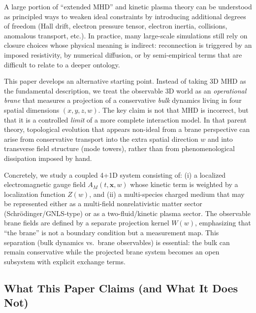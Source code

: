 \documentclass[11pt]{article}
\newcommand{\x}{\mathbf{x}}     %
\begin{document}
A large portion of ``extended MHD'' and kinetic plasma theory can be understood as principled ways to weaken ideal constraints by introducing additional degrees of freedom (Hall drift, electron pressure tensor, electron inertia, collisions, anomalous transport, etc.). In practice, many large-scale simulations still rely on closure choices whose physical meaning is indirect: reconnection is triggered by an imposed resistivity, by numerical diffusion, or by semi-empirical terms that are difficult to relate to a deeper ontology.

This paper develops an alternative starting point. Instead of taking 3D MHD as the fundamental description, we treat the observable 3D world as an \emph{operational brane} that measures a projection of a conservative \emph{bulk} dynamics living in four spatial dimensions \((x,y,z,w)\). The key claim is not that MHD is incorrect, but that it is a controlled \emph{limit} of a more complete interaction model. In that parent theory, topological evolution that appears non-ideal from a brane perspective can arise from conservative transport into the extra spatial direction \(w\) and into transverse field structure (mode towers), rather than from phenomenological dissipation imposed by hand.

Concretely, we study a coupled 4+1D system consisting of:
(i) a localized electromagnetic gauge field \(A_M(t,\x,w)\) whose kinetic term is weighted by a localization function \(Z(w)\), and
(ii) a multi-species charged medium that may be represented either as a multi-field nonrelativistic matter sector (Schr\"odinger/GNLS-type) or as a two-fluid/kinetic plasma sector.
The observable brane fields are defined by a separate projection kernel \(W(w)\), emphasizing that ``the brane'' is not a boundary condition but a measurement map. This separation (bulk dynamics vs.\ brane observables) is essential: the bulk can remain conservative while the projected brane system becomes an open subsystem with explicit exchange terms.

\subsection{What This Paper Claims (and What It Does Not)}
\label{sec:claims_scope}
\end{document}
